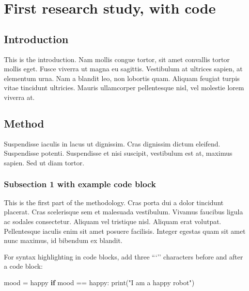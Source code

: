 \documentclass[12pt,a4paper,]{report}
\newenvironment{Shaded}{}{}
\newcommand{\BuiltInTok}[1]{#1}
\newcommand{\ControlFlowTok}[1]{\textcolor[rgb]{0.00,0.44,0.13}{\textbf{#1}}}
\newcommand{\NormalTok}[1]{#1}
\newcommand{\OperatorTok}[1]{\textcolor[rgb]{0.40,0.40,0.40}{#1}}
\newcommand{\StringTok}[1]{\textcolor[rgb]{0.25,0.44,0.63}{#1}}
\begin{document}
\hypertarget{first-research-study-with-code}{%
\chapter{First research study, with
code}\label{first-research-study-with-code}}

\hypertarget{introduction-1}{%
\section{Introduction}\label{introduction-1}}

This is the introduction. Nam mollis congue tortor, sit amet convallis
tortor mollis eget. Fusce viverra ut magna eu sagittis. Vestibulum at
ultrices sapien, at elementum urna. Nam a blandit leo, non lobortis
quam. Aliquam feugiat turpis vitae tincidunt ultricies. Mauris
ullamcorper pellentesque nisl, vel molestie lorem viverra at.

\hypertarget{method}{%
\section{Method}\label{method}}

Suspendisse iaculis in lacus ut dignissim. Cras dignissim dictum
eleifend. Suspendisse potenti. Suspendisse et nisi suscipit, vestibulum
est at, maximus sapien. Sed ut diam tortor.

\hypertarget{subsection-1-with-example-code-block}{%
\subsection{Subsection 1 with example code
block}\label{subsection-1-with-example-code-block}}

This is the first part of the methodology. Cras porta dui a dolor
tincidunt placerat. Cras scelerisque sem et malesuada vestibulum.
Vivamus faucibus ligula ac sodales consectetur. Aliquam vel tristique
nisl. Aliquam erat volutpat. Pellentesque iaculis enim sit amet posuere
facilisis. Integer egestas quam sit amet nunc maximus, id bibendum ex
blandit.

For syntax highlighting in code blocks, add three ```'' characters
before and after a code block:

\begin{Shaded}
\begin{Highlighting}[]
\NormalTok{mood }\OperatorTok{=} \StringTok{\textquotesingle{}happy\textquotesingle{}}
\ControlFlowTok{if}\NormalTok{ mood }\OperatorTok{==} \StringTok{\textquotesingle{}happy\textquotesingle{}}\NormalTok{:}
    \BuiltInTok{print}\NormalTok{(}\StringTok{"I am a happy robot"}\NormalTok{)}
\end{Highlighting}
\end{Shaded}
\end{document}
